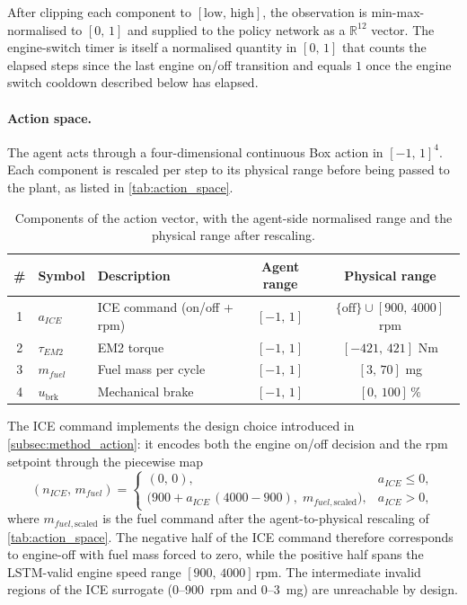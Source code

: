 After clipping each component to $[\text{low},\,\text{high}]$, the observation is min-max-normalised to $[0,\,1]$ and supplied to the policy network as a $\mathbb{R}^{12}$ vector. The engine-switch timer is itself a normalised quantity in $[0,\,1]$ that counts the elapsed steps since the last engine on/off transition and equals $1$ once the engine switch cooldown described below has elapsed.

\paragraph{Action space.}
The agent acts through a four-dimensional continuous Box action in $[-1,\,1]^{4}$. Each component is rescaled per step to its physical range before being passed to the plant, as listed in \autoref{tab:action_space}.

\begin{table}[H]
  \centering
  \small
  \begin{tabular}{|c|l|l|c|c|}
    \hline
    \textbf{\#} & \textbf{Symbol} & \textbf{Description} & \textbf{Agent range} & \textbf{Physical range} \\
    \hline
    1 & $a_{ICE}$          & ICE command (on/off + rpm) & $[-1,\,1]$ & $\{\text{off}\} \cup [900,\,4000]$ rpm \\
    2 & $\tau_{EM2}$        & EM2 torque                 & $[-1,\,1]$ & $[-421,\,421]$ Nm \\
    3 & $m_{fuel}$          & Fuel mass per cycle        & $[-1,\,1]$ & $[3,\,70]$ mg \\
    4 & $u_{\text{brk}}$    & Mechanical brake           & $[-1,\,1]$ & $[0,\,100]\,\%$ \\
    \hline
  \end{tabular}
  \caption[Action-vector components and ranges]{Components of the action vector, with the agent-side normalised range and the physical range after rescaling.}
  \label{tab:action_space}
\end{table}

The ICE command implements the design choice introduced in \autoref{subsec:method_action}: it encodes both the engine on/off decision and the rpm setpoint through the piecewise map
\begin{equation}
  (n_{ICE},\,m_{fuel}) =
  \begin{cases}
    (0,\,0), & a_{ICE} \le 0, \\
    \bigl(900 + a_{ICE}\,(4000 - 900),\;m_{fuel,\text{scaled}}\bigr), & a_{ICE} > 0,
  \end{cases}
  \label{eq:ice_command}
\end{equation}
where $m_{fuel,\text{scaled}}$ is the fuel command after the agent-to-physical rescaling of \autoref{tab:action_space}. The negative half of the ICE command therefore corresponds to engine-off with fuel mass forced to zero, while the positive half spans the LSTM-valid engine speed range $[900,\,4000]\,\text{rpm}$. The intermediate invalid regions of the ICE surrogate (0--900~rpm and 0--3~mg) are unreachable by design.

